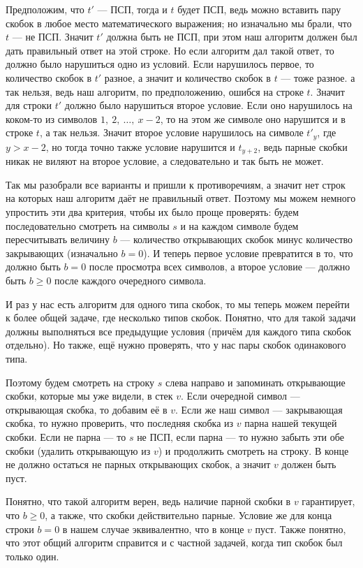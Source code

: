Предположим, что $t'$ — ПСП, тогда и $t$ будет ПСП, ведь можно вставить пару скобок в любое место математического выражения; но изначально мы брали, что $t$ — не ПСП. Значит $t'$ должна быть не ПСП, при этом наш алгоритм должен был дать правильный ответ на этой строке. Но если алгоритм дал такой ответ, то должно было нарушиться одно из условий. Если нарушилось первое, то количество скобок в $t'$ разное, а значит и количество скобок в $t$ — тоже разное. а так нельзя, ведь наш алгоритм, по предположению, ошибся на строке $t$. Значит для строки $t'$ должно было нарушиться второе условие. Если оно нарушилось на коком-то из символов $1,\ 2,\ \ldots,\ x-2$, то на этом же символе оно нарушится и в строке $t$, а так нельзя. Значит второе условие нарушилось на символе $t'_y$, где $y > x - 2$, но тогда точно также условие нарушится и $t_{y + 2}$, ведь парные скобки никак не виляют на второе условие, а следовательно и так быть не может.

Так мы разобрали все варианты и пришли к противоречиям, а значит нет строк на которых наш алгоритм даёт не правильный ответ. Поэтому мы можем немного упростить эти два критерия, чтобы их было проще проверять: будем последовательно смотреть на символы $s$ и на каждом символе будем пересчитывать величину $b$ — количество открывающих скобок минус количество закрывающих (изначально $b=0$). И теперь первое условие превратится в то, что должно быть $b=0$ после просмотра всех символов, а второе условие — должно быть $b \geq 0$ после каждого очередного символа.

И раз у нас есть алгоритм для одного типа скобок, то мы теперь можем перейти к более общей задаче, где несколько типов скобок. Понятно, что для такой задачи должны выполняться все предыдущие условия (причём для каждого типа скобок отдельно). Но также, ещё нужно проверять, что у нас пары скобок одинакового типа.

Поэтому будем смотреть на строку $s$ слева направо и запоминать открывающие скобки, которые мы уже видели, в стек $v$. Если очередной символ — открывающая скобка, то добавим её в $v$. Если же наш символ — закрывающая скобка, то нужно проверить, что последняя скобка из $v$ парна нашей текущей скобки. Если не парна — то $s$ не ПСП, если парна — то нужно забыть эти обе скобки (удалить открывающую из $v$) и продолжить смотреть на строку. В конце не должно остаться не парных открывающих скобок, а значит $v$ должен быть пуст.

Понятно, что такой алгоритм верен, ведь наличие парной скобки в $v$ гарантирует, что $b \geq 0$, а также, что скобки действительно парные. Условие же для конца строки $b=0$ в нашем случае эквивалентно, что в конце $v$ пуст. Также понятно, что этот общий алгоритм справится и с частной задачей, когда тип скобок был только один.

